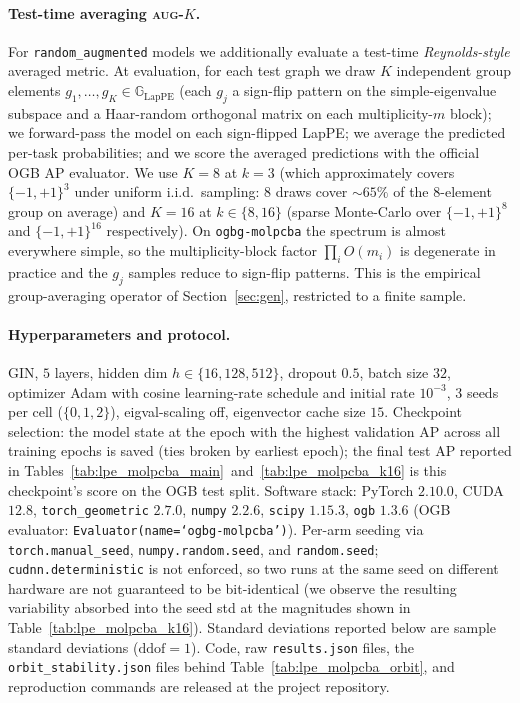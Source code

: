 \documentclass{article}
\theoremstyle{definition}
\theoremstyle{plain}
\newcommand{\G}{\mathbb{G}}
\begin{document}
\paragraph{Test-time averaging \textsc{aug-$K$}.}
For \texttt{random\_augmented} models we additionally evaluate a
test-time \emph{Reynolds-style} averaged metric. At evaluation, for
each test graph we draw $K$ independent group elements
$g_1,\ldots,g_K \in \G_{\mathrm{LapPE}}$ (each $g_j$ a sign-flip pattern
on the simple-eigenvalue subspace and a Haar-random orthogonal matrix
on each multiplicity-$m$ block); we forward-pass the model on each
sign-flipped LapPE; we average the predicted per-task probabilities;
and we score the averaged predictions with the official OGB AP
evaluator. We use $K\!=\!8$ at $k\!=\!3$ (which approximately covers
$\{-1,+1\}^{3}$ under uniform i.i.d.\ sampling: $8$ draws cover
$\sim\!65\%$ of the $8$-element group on average) and $K\!=\!16$ at
$k\!\in\!\{8,16\}$ (sparse Monte-Carlo over $\{-1,+1\}^{8}$ and
$\{-1,+1\}^{16}$ respectively). On \texttt{ogbg-molpcba} the
spectrum is almost everywhere simple, so the
multiplicity-block factor $\prod_i O(m_i)$ is degenerate in
practice and the $g_j$ samples reduce to sign-flip patterns.
This is the empirical group-averaging operator of
Section~\ref{sec:gen}, restricted to a finite sample.

\paragraph{Hyperparameters and protocol.}
GIN, $5$ layers, hidden dim $h\!\in\!\{16,128,512\}$, dropout $0.5$,
batch size $32$, optimizer Adam with cosine learning-rate schedule and
initial rate $10^{-3}$, $3$ seeds per cell ($\{0,1,2\}$),
eigval-scaling off, eigenvector cache size $15$. Checkpoint selection:
the model state at the epoch with the highest validation AP across
all training epochs is saved (ties broken by earliest epoch); the
final test AP reported in
Tables~\ref{tab:lpe_molpcba_main}~and~\ref{tab:lpe_molpcba_k16} is
this checkpoint's score on the OGB test split. Software stack:
PyTorch $2.10.0$, CUDA $12.8$, \texttt{torch\_geometric} $2.7.0$,
\texttt{numpy} $2.2.6$, \texttt{scipy} $1.15.3$, \texttt{ogb} $1.3.6$
(OGB evaluator: \texttt{Evaluator(name=`ogbg-molpcba')}). Per-arm
seeding via \texttt{torch.manual\_seed}, \texttt{numpy.random.seed},
and \texttt{random.seed}; \texttt{cudnn.deterministic} is not
enforced, so two runs at the same seed on different hardware are not
guaranteed to be bit-identical (we observe the resulting variability
absorbed into the seed std at the magnitudes shown in
Table~\ref{tab:lpe_molpcba_k16}). Standard deviations reported below
are sample standard deviations ($\mathrm{ddof}\!=\!1$). Code, raw
\texttt{results.json} files, the \texttt{orbit\_stability.json} files
behind Table~\ref{tab:lpe_molpcba_orbit}, and reproduction commands
are released at the project repository.
\end{document}
